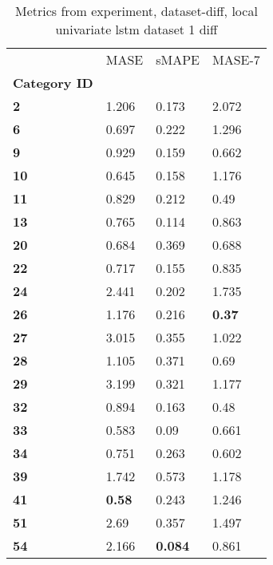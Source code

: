 \begin{table}[H]
\centering
\caption{Metrics from experiment, dataset-diff, local univariate lstm dataset 1 diff}
\label{table:local-univariate-lstm-dataset-1-diff-dataset-diff}
\begin{tabular}{llll}
\toprule
{} &           MASE &           sMAPE &         MASE-7 \\
\textbf{Category ID} &                &                 &                \\
\midrule
\textbf{2          } &          1.206 &           0.173 &          2.072 \\
\textbf{6          } &          0.697 &           0.222 &          1.296 \\
\textbf{9          } &          0.929 &           0.159 &          0.662 \\
\textbf{10         } &          0.645 &           0.158 &          1.176 \\
\textbf{11         } &          0.829 &           0.212 &           0.49 \\
\textbf{13         } &          0.765 &           0.114 &          0.863 \\
\textbf{20         } &          0.684 &           0.369 &          0.688 \\
\textbf{22         } &          0.717 &           0.155 &          0.835 \\
\textbf{24         } &          2.441 &           0.202 &          1.735 \\
\textbf{26         } &          1.176 &           0.216 &  \textbf{0.37} \\
\textbf{27         } &          3.015 &           0.355 &          1.022 \\
\textbf{28         } &          1.105 &           0.371 &           0.69 \\
\textbf{29         } &          3.199 &           0.321 &          1.177 \\
\textbf{32         } &          0.894 &           0.163 &           0.48 \\
\textbf{33         } &          0.583 &            0.09 &          0.661 \\
\textbf{34         } &          0.751 &           0.263 &          0.602 \\
\textbf{39         } &          1.742 &           0.573 &          1.178 \\
\textbf{41         } &  \textbf{0.58} &           0.243 &          1.246 \\
\textbf{51         } &           2.69 &           0.357 &          1.497 \\
\textbf{54         } &          2.166 &  \textbf{0.084} &          0.861 \\
\bottomrule
\end{tabular}
\end{table}
